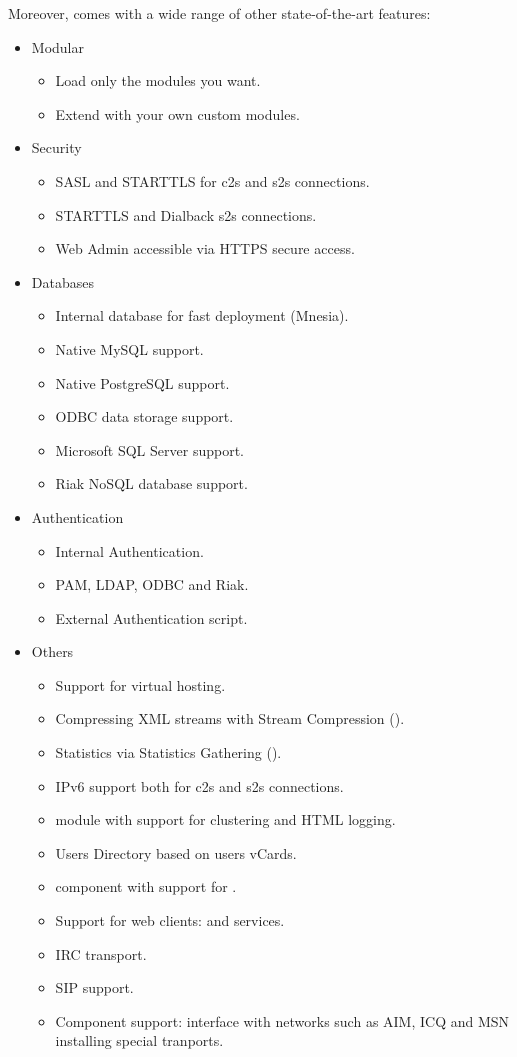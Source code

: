 Moreover, \ejabberd{} comes with a wide range of other state-of-the-art features:
\begin{itemize}
\item Modular
\begin{itemize}
\item Load only the modules you want.
\item Extend \ejabberd{} with your own custom modules.
\end{itemize}
\item Security
\begin{itemize}
\item SASL and STARTTLS for c2s and s2s connections.
\item STARTTLS and Dialback s2s connections.
\item Web Admin accessible via HTTPS secure access.
\end{itemize}
\item Databases
\begin{itemize}
\item Internal database for fast deployment (Mnesia).
\item Native MySQL support.
\item Native PostgreSQL support.
\item ODBC data storage support.
\item Microsoft SQL Server support. %
\item Riak NoSQL database support.
\end{itemize}
\item Authentication
\begin{itemize}
\item Internal Authentication.
\item PAM, LDAP, ODBC and Riak.  %
\item External Authentication script.
\end{itemize}
\item Others
\begin{itemize}
\item Support for virtual hosting.
\item Compressing XML streams with Stream Compression ().
\item Statistics via Statistics Gathering ().
\item IPv6 support both for c2s and s2s connections.
\item {} module with support for clustering and HTML logging. %
\item Users Directory based on users vCards.
\item {} component with support for .
\item Support for web clients:  and  services.
\item IRC transport.
\item SIP support.
\item Component support: interface with networks such as AIM, ICQ and MSN installing special tranports.
\end{itemize}
\end{itemize}
